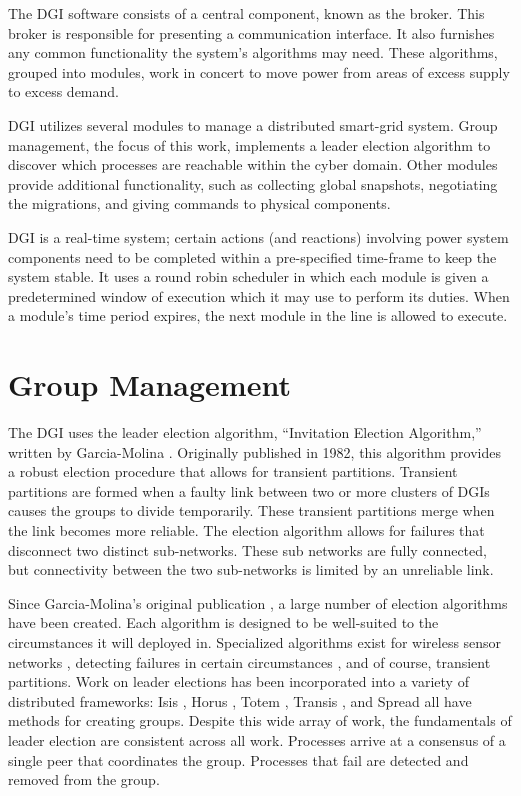 The DGI software consists of a central component, known as the broker.
This broker is responsible for presenting a communication interface.
It also furnishes any common functionality the system's algorithms may need.
These algorithms, grouped into modules, work in concert to move power from areas of excess supply to excess demand.

DGI utilizes several modules to manage a distributed smart-grid system.
Group management, the focus of this work, implements a leader election algorithm to discover which processes are reachable within the cyber domain.
Other modules provide additional functionality, such as collecting global snapshots, negotiating the migrations, and giving commands to physical components.

DGI is a real-time system; certain actions (and reactions) involving power system components need to be completed within a pre-specified time-frame to keep the system stable.
It uses a round robin scheduler in which each module is given a predetermined window of execution which it may use to perform its duties.
When a module's time period expires, the next module in the line is allowed to execute. 

\section{Group Management}
The DGI uses the leader election algorithm, ``Invitation Election Algorithm,'' written by Garcia-Molina \cite{INVITATIONELECTION}.
Originally published in 1982, this algorithm provides a robust election  procedure that allows for transient partitions.
Transient partitions are formed when a faulty link between two or more clusters of DGIs causes the groups to divide temporarily.
These transient partitions merge when the link becomes more reliable.
The election algorithm allows for failures that disconnect two distinct sub-networks.
These sub networks are fully connected, but connectivity between the two sub-networks is limited by an unreliable link.

Since Garcia-Molina's original publication \cite{INVITATIONELECTION}, a large number of election algorithms have been created. 
Each algorithm is designed to be well-suited to the circumstances it will deployed in.
Specialized algorithms exist for wireless sensor networks \cite{LE-WSN-1}\cite{LE-WSN-2}, detecting failures in certain circumstances \cite{LE-SPECIALCIRCUMSTANCES-1}\cite{LE-SPECIALCIRCUMSTANCES-2}, and of course, transient partitions.
Work on leader elections has been incorporated into a variety of distributed frameworks: Isis \cite{ISISTOOLKIT}, Horus \cite{HORUSTOOLKIT}, Totem \cite{TOTEMTOOLKIT}, Transis \cite{TRANSISTOOLKIT}, and Spread \cite{SPREADTOOLKIT} all have methods for creating groups.
Despite this wide array of work, the fundamentals of leader election are consistent
across all work.
Processes arrive at a consensus of a single peer that coordinates the group.
Processes that fail are detected and removed from the group. 

